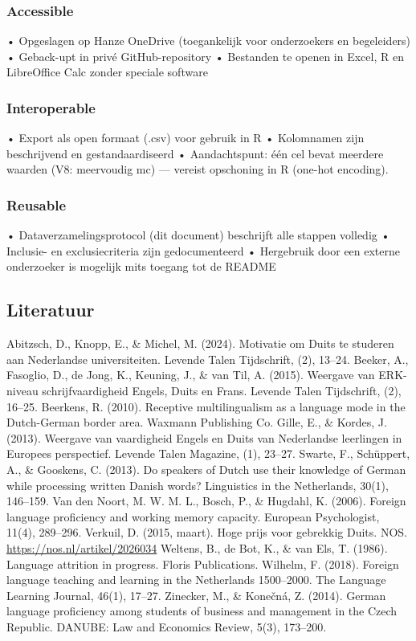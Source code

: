 \documentclass[
]{article}
\begin{document}
\subsubsection{Accessible}\label{accessible}

• Opgeslagen op Hanze OneDrive (toegankelijk voor onderzoekers en
begeleiders) • Geback-upt in privé GitHub-repository • Bestanden te
openen in Excel, R en LibreOffice Calc zonder speciale software

\subsubsection{Interoperable}\label{interoperable}

• Export als open formaat (.csv) voor gebruik in R • Kolomnamen zijn
beschrijvend en gestandaardiseerd • Aandachtspunt: één cel bevat
meerdere waarden (V8: meervoudig mc) --- vereist opschoning in R
(one-hot encoding).

\subsubsection{Reusable}\label{reusable}

• Dataverzamelingsprotocol (dit document) beschrijft alle stappen
volledig • Inclusie- en exclusiecriteria zijn gedocumenteerd •
Hergebruik door een externe onderzoeker is mogelijk mits toegang tot de
README

\subsection{Literatuur}\label{literatuur}

Abitzsch, D., Knopp, E., \& Michel, M. (2024). Motivatie om Duits te
studeren aan Nederlandse universiteiten. Levende Talen Tijdschrift, (2),
13--24. Beeker, A., Fasoglio, D., de Jong, K., Keuning, J., \& van Til,
A. (2015). Weergave van ERK-niveau schrijfvaardigheid Engels, Duits en
Frans. Levende Talen Tijdschrift, (2), 16--25. Beerkens, R. (2010).
Receptive multilingualism as a language mode in the Dutch-German border
area. Waxmann Publishing Co. Gille, E., \& Kordes, J. (2013). Weergave
van vaardigheid Engels en Duits van Nederlandse leerlingen in Europees
perspectief. Levende Talen Magazine, (1), 23--27. Swarte, F., Schüppert,
A., \& Gooskens, C. (2013). Do speakers of Dutch use their knowledge of
German while processing written Danish words? Linguistics in the
Netherlands, 30(1), 146--159. Van den Noort, M. W. M. L., Bosch, P., \&
Hugdahl, K. (2006). Foreign language proficiency and working memory
capacity. European Psychologist, 11(4), 289--296. Verkuil, D. (2015,
maart). Hoge prijs voor gebrekkig Duits. NOS.
\url{https://nos.nl/artikel/2026034} Weltens, B., de Bot, K., \& van
Els, T. (1986). Language attrition in progress. Floris Publications.
Wilhelm, F. (2018). Foreign language teaching and learning in the
Netherlands 1500--2000. The Language Learning Journal, 46(1), 17--27.
Zinecker, M., \& Konečná, Z. (2014). German language proficiency among
students of business and management in the Czech Republic. DANUBE: Law
and Economics Review, 5(3), 173--200.
\end{document}
